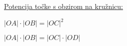 \documentclass[9pt,oneside,a4paper]{report}
\begin{document}
\vspace{4mm}
\noindent
\underline{Potencija to\v{c}ke s obzirom na kru\v{z}nicu:}

\hspace{2mm}
\noindent
\begin{minipage}[t]{70mm}

	\noindent
	$\displaystyle |OA|\cdot |OB|=|OC|^2$
\end{minipage}
\begin{minipage}[t]{60mm}

	\noindent
	$\displaystyle |OA|\cdot |OB|=|OC|\cdot |OD|$
\end{minipage}

\vspace{1mm}
\hfill{}
\end{document}
